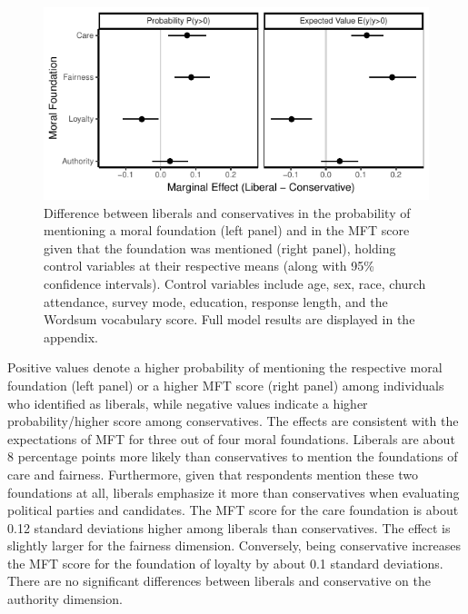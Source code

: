 \documentclass[12pt]{article}
\begin{document}
\begin{figure}[ht]\centering
\includegraphics{../calc/fig/tobit_ideol.pdf}
\caption{Difference between liberals and conservatives in the probability of mentioning a moral foundation (left panel) and in the MFT score given that the foundation was mentioned (right panel), holding control variables at their respective means (along with 95\% confidence intervals). Control variables include age, sex, race, church attendance, survey mode, education, response length, and the Wordsum vocabulary score. Full model results are displayed in the appendix.
}\label{fig:tobit_ideol}
\end{figure}

Positive values denote a higher probability of mentioning the respective moral foundation (left panel) or a higher MFT score (right panel) among individuals who identified as liberals, while negative values indicate a higher probability/higher score among conservatives. The effects are consistent with the expectations of MFT for three out of four moral foundations. Liberals are about 8 percentage points more likely than conservatives to mention the foundations of care and fairness. Furthermore, given that respondents mention these two foundations at all, liberals emphasize it more than conservatives when evaluating political parties and candidates. The MFT score for the care foundation is about 0.12 standard deviations higher among liberals than conservatives. The effect is slightly larger for the fairness dimension. Conversely, being conservative increases the MFT score for the foundation of loyalty by about 0.1 standard deviations. There are no significant differences between liberals and conservative on the authority dimension.

\end{document}
